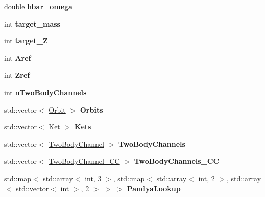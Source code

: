 \begin{DoxyCompactItemize}
\item 
\mbox{\label{classModelSpace_ac443b316ecf89bf3476ba6f541f3563c}} 
double {\bfseries hbar\+\_\+omega}
\item 
\mbox{\label{classModelSpace_ac0ef9c553ca3db16a019205d6c8a2b26}} 
int {\bfseries target\+\_\+mass}
\item 
\mbox{\label{classModelSpace_a6fc5c2a8fed28f70114a3dd81b93fe74}} 
int {\bfseries target\+\_\+Z}
\item 
\mbox{\label{classModelSpace_a81d21aa5d47ef8cdcd00cd166fc5a561}} 
int {\bfseries Aref}
\item 
\mbox{\label{classModelSpace_aa6f60ad193a7602da82501d0f76a00ca}} 
int {\bfseries Zref}
\item 
\mbox{\label{classModelSpace_aea2ac4cf6e2f53d7cd96b208cbc165f3}} 
int {\bfseries n\+Two\+Body\+Channels}
\item 
\mbox{\label{classModelSpace_ad382c9f244fa3a70aba2a328d3326751}} 
std\+::vector$<$ \hyperlink{classOrbit}{Orbit} $>$ {\bfseries Orbits}
\item 
\mbox{\label{classModelSpace_a27f8b0e00ffcf55ddb8e3459948e905e}} 
std\+::vector$<$ \hyperlink{classKet}{Ket} $>$ {\bfseries Kets}
\item 
\mbox{\label{classModelSpace_a9f36ca070b17389a2bdbd42345de509c}} 
std\+::vector$<$ \hyperlink{classTwoBodyChannel}{Two\+Body\+Channel} $>$ {\bfseries Two\+Body\+Channels}
\item 
\mbox{\label{classModelSpace_aad7f4fd5fa7c46f3a7a138c1e5092eda}} 
std\+::vector$<$ \hyperlink{classTwoBodyChannel__CC}{Two\+Body\+Channel\+\_\+\+CC} $>$ {\bfseries Two\+Body\+Channels\+\_\+\+CC}
\item 
\mbox{\label{classModelSpace_a9d0562519e33fd9e162f63eed0402bcc}} 
std\+::map$<$ std\+::array$<$ int, 3 $>$, std\+::map$<$ std\+::array$<$ int, 2 $>$, std\+::array$<$ std\+::vector$<$ int $>$, 2 $>$ $>$ $>$ {\bfseries Pandya\+Lookup}

\end{DoxyCompactItemize}
